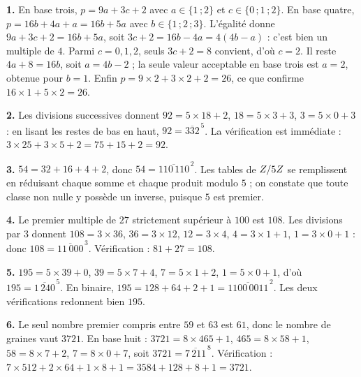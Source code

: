 \begin{corrige}[annales]
\textbf{1.} En base trois, $p = 9a+3c+2$ avec $a \in \{1\,;2\}$ et
$c \in \{0\,;1\,;2\}$. En base quatre, $p = 16b+4a+a = 16b+5a$ avec
$b \in \{1\,;2\,;3\}$. L'égalité donne $9a+3c+2 = 16b+5a$, soit
$3c+2 = 16b-4a = 4(4b-a)$ : c'est bien un multiple de $4$. Parmi
$c = 0,1,2$, seuls $3c+2 = 8$ convient, d'où $c = 2$. Il reste
$4a+8 = 16b$, soit $a = 4b-2$ ; la seule valeur acceptable en base trois est
$a = 2$, obtenue pour $b = 1$. Enfin $p = 9\times2+3\times2+2 = 26$, ce que
confirme $16\times1+5\times2 = 26$.

\textbf{2.} Les divisions successives donnent $92 = 5\times18+2$,
$18 = 5\times3+3$, $3 = 5\times0+3$ : en lisant les restes de bas en haut,
$92 = \overline{332}^{\,5}$. La vérification est immédiate :
$3\times25+3\times5+2 = 75+15+2 = 92$.

\textbf{3.} $54 = 32+16+4+2$, donc $54 = \overline{110\,110}^{\,2}$. Les
tables de $Z/5Z$ se remplissent en réduisant chaque somme et chaque produit
modulo $5$ ; on constate que toute classe non nulle y possède un inverse,
puisque $5$ est premier.

\textbf{4.} Le premier multiple de $27$ strictement supérieur à $100$ est
$108$. Les divisions par $3$ donnent $108 = 3\times36$, $36 = 3\times12$,
$12 = 3\times4$, $4 = 3\times1+1$, $1 = 3\times0+1$ : donc
$108 = \overline{11\,000}^{\,3}$. Vérification : $81+27 = 108$.

\textbf{5.} $195 = 5\times39+0$, $39 = 5\times7+4$, $7 = 5\times1+2$,
$1 = 5\times0+1$, d'où $195 = \overline{1\,240}^{\,5}$. En binaire,
$195 = 128+64+2+1 = \overline{1100\,0011}^{\,2}$. Les deux vérifications
redonnent bien $195$.

\textbf{6.} Le seul nombre premier compris entre $59$ et $63$ est $61$, donc
le nombre de graines vaut $3721$. En base huit : $3721 = 8\times465+1$,
$465 = 8\times58+1$, $58 = 8\times7+2$, $7 = 8\times0+7$, soit
$3721 = \overline{7\,211}^{\,8}$. Vérification :
$7\times512+2\times64+1\times8+1 = 3584+128+8+1 = 3721$.
\end{corrige}

